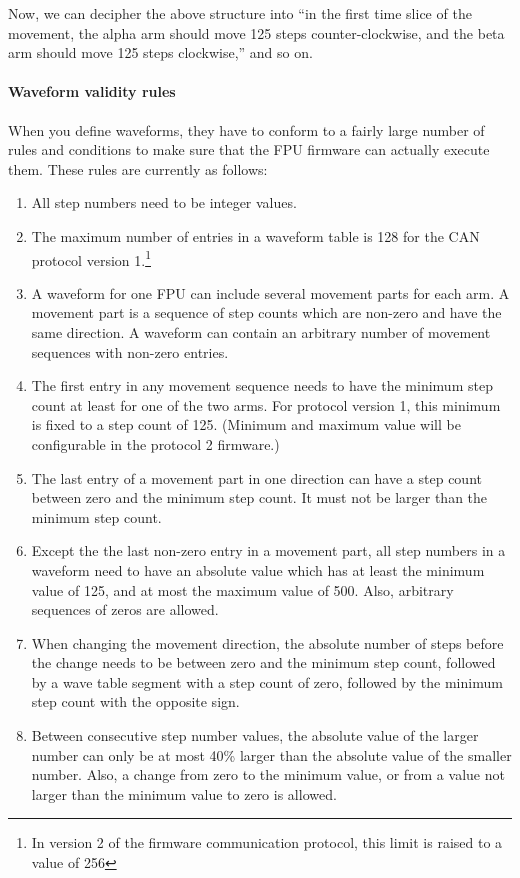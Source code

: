 \documentclass[11pt,a4paper]{scrartcl}
\begin{document}
Now, we can decipher the above structure into ``in the first time
slice of the movement, the alpha arm should move 125 steps
counter-clockwise, and the beta arm should move 125 steps
clockwise,'' and so on.

\paragraph{Waveform validity rules}

When you define waveforms, they have to conform to a fairly large
number of rules and conditions to make sure that the FPU firmware can
actually execute them. These rules are currently as follows:

\begin{enumerate}

\item All step numbers need to be integer values.

\item The maximum number of entries in a waveform table is 128 for the
  CAN protocol version 1.\footnote{In version 2 of the firmware
    communication protocol, this limit is raised to a value of 256}
  
\item A waveform for one FPU can include several movement parts for
  each arm. A movement part is a sequence of step counts which are
  non-zero and have the same direction.  A waveform can contain an
  arbitrary number of movement sequences with non-zero entries.

\item The first entry in any movement sequence needs to have the
  minimum step count at least for one of the two arms.  For protocol
  version 1, this minimum is fixed to a step count of 125. (Minimum
  and maximum value will be configurable in the protocol 2 firmware.)

\item The last entry of a movement part in one direction can have a
  step count between zero and the minimum step count. It must not be
  larger than the minimum step count.
  
\item Except the the last non-zero entry in a movement part, all step
  numbers in a waveform need to have an absolute value which has at
  least the minimum value of 125, and at most the maximum value of
  500. Also, arbitrary sequences of zeros are allowed.

\item When changing the movement direction, the absolute number of
  steps before the change needs to be between zero and the minimum
  step count, followed by a wave table segment with a step count of
  zero, followed by the minimum step count with the opposite sign.

\item Between consecutive step number values, the absolute value of
  the larger number can only be at most 40\% larger than the absolute
  value of the smaller number. Also, a change from zero to the minimum
  value, or from a value not larger than the minimum value to zero is
  allowed.

  
\end{enumerate}
\end{document}
